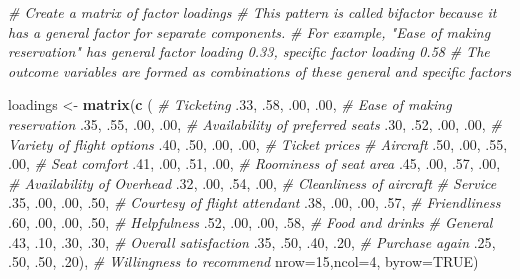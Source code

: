\documentclass[
]{article}
\newenvironment{Shaded}{\begin{snugshade}}{\end{snugshade}}
\newcommand{\CommentTok}[1]{\textcolor[rgb]{0.56,0.35,0.01}{\textit{#1}}}
\newcommand{\DataTypeTok}[1]{\textcolor[rgb]{0.13,0.29,0.53}{#1}}
\newcommand{\DecValTok}[1]{\textcolor[rgb]{0.00,0.00,0.81}{#1}}
\newcommand{\FloatTok}[1]{\textcolor[rgb]{0.00,0.00,0.81}{#1}}
\newcommand{\KeywordTok}[1]{\textcolor[rgb]{0.13,0.29,0.53}{\textbf{#1}}}
\newcommand{\NormalTok}[1]{#1}
\newcommand{\OtherTok}[1]{\textcolor[rgb]{0.56,0.35,0.01}{#1}}
\newcommand{\StringTok}[1]{\textcolor[rgb]{0.31,0.60,0.02}{#1}}
\begin{document}
\begin{Shaded}
\begin{Highlighting}[]
\CommentTok{# Create a matrix of factor loadings}
\CommentTok{# This pattern is called bifactor because it has a general factor for separate components.}
\CommentTok{# For example, "Ease of making reservation" has general factor loading 0.33, specific factor loading 0.58}
\CommentTok{# The outcome variables are formed as combinations of these general and specific factors}

\NormalTok{loadings <-}\StringTok{ }\KeywordTok{matrix}\NormalTok{(}\KeywordTok{c}\NormalTok{ (}
  \CommentTok{# Ticketing}
  \FloatTok{.33}\NormalTok{, }\FloatTok{.58}\NormalTok{, }\FloatTok{.00}\NormalTok{, }\FloatTok{.00}\NormalTok{,  }\CommentTok{# Ease of making reservation }
  \FloatTok{.35}\NormalTok{, }\FloatTok{.55}\NormalTok{, }\FloatTok{.00}\NormalTok{, }\FloatTok{.00}\NormalTok{,  }\CommentTok{# Availability of preferred seats}
  \FloatTok{.30}\NormalTok{, }\FloatTok{.52}\NormalTok{, }\FloatTok{.00}\NormalTok{, }\FloatTok{.00}\NormalTok{,  }\CommentTok{# Variety of flight options}
  \FloatTok{.40}\NormalTok{, }\FloatTok{.50}\NormalTok{, }\FloatTok{.00}\NormalTok{, }\FloatTok{.00}\NormalTok{,  }\CommentTok{# Ticket prices}
  \CommentTok{# Aircraft}
  \FloatTok{.50}\NormalTok{, }\FloatTok{.00}\NormalTok{, }\FloatTok{.55}\NormalTok{, }\FloatTok{.00}\NormalTok{,  }\CommentTok{# Seat comfort}
  \FloatTok{.41}\NormalTok{, }\FloatTok{.00}\NormalTok{, }\FloatTok{.51}\NormalTok{, }\FloatTok{.00}\NormalTok{,  }\CommentTok{# Roominess of seat area}
  \FloatTok{.45}\NormalTok{, }\FloatTok{.00}\NormalTok{, }\FloatTok{.57}\NormalTok{, }\FloatTok{.00}\NormalTok{,  }\CommentTok{# Availability of Overhead}
  \FloatTok{.32}\NormalTok{, }\FloatTok{.00}\NormalTok{, }\FloatTok{.54}\NormalTok{, }\FloatTok{.00}\NormalTok{,  }\CommentTok{# Cleanliness of aircraft}
  \CommentTok{# Service}
  \FloatTok{.35}\NormalTok{, }\FloatTok{.00}\NormalTok{, }\FloatTok{.00}\NormalTok{, }\FloatTok{.50}\NormalTok{,  }\CommentTok{# Courtesy of flight attendant}
  \FloatTok{.38}\NormalTok{, }\FloatTok{.00}\NormalTok{, }\FloatTok{.00}\NormalTok{, }\FloatTok{.57}\NormalTok{,  }\CommentTok{# Friendliness}
  \FloatTok{.60}\NormalTok{, }\FloatTok{.00}\NormalTok{, }\FloatTok{.00}\NormalTok{, }\FloatTok{.50}\NormalTok{,  }\CommentTok{# Helpfulness}
  \FloatTok{.52}\NormalTok{, }\FloatTok{.00}\NormalTok{, }\FloatTok{.00}\NormalTok{, }\FloatTok{.58}\NormalTok{,  }\CommentTok{# Food and drinks}
  \CommentTok{# General   }
  \FloatTok{.43}\NormalTok{, }\FloatTok{.10}\NormalTok{, }\FloatTok{.30}\NormalTok{, }\FloatTok{.30}\NormalTok{,  }\CommentTok{# Overall satisfaction}
  \FloatTok{.35}\NormalTok{, }\FloatTok{.50}\NormalTok{, }\FloatTok{.40}\NormalTok{, }\FloatTok{.20}\NormalTok{,  }\CommentTok{# Purchase again}
  \FloatTok{.25}\NormalTok{, }\FloatTok{.50}\NormalTok{, }\FloatTok{.50}\NormalTok{, }\FloatTok{.20}\NormalTok{), }\CommentTok{# Willingness to recommend}
  \DataTypeTok{nrow=}\DecValTok{15}\NormalTok{,}\DataTypeTok{ncol=}\DecValTok{4}\NormalTok{, }\DataTypeTok{byrow=}\OtherTok{TRUE}\NormalTok{)}
  

\end{Highlighting}
\end{Shaded}
\end{document}
